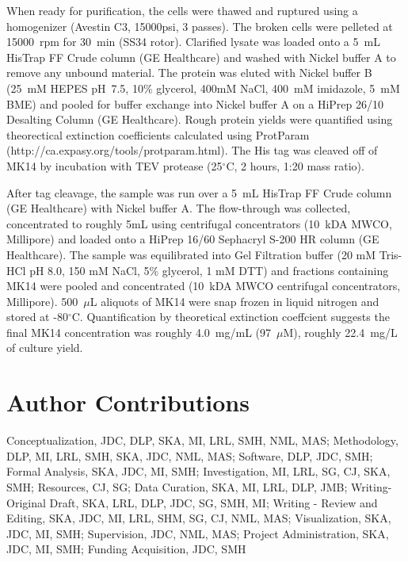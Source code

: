 \documentclass[phd,tocprelim]{cornell}
\begin{document}
When ready for purification, the cells were thawed and ruptured using a homogenizer (Avestin C3, 15000psi, 3 passes). The broken cells were pelleted at 15000~rpm for 30~min (SS34 rotor). Clarified lysate was loaded onto a  5~mL HisTrap FF Crude column (GE Healthcare) and washed with Nickel buffer A to remove any unbound material. The protein was eluted with Nickel buffer B (25~mM HEPES pH~7.5, 10\% glycerol, 400mM NaCl, 400~mM imidazole, 5~mM BME) and pooled for buffer exchange into Nickel buffer A on a HiPrep 26/10 Desalting Column (GE Healthcare). Rough protein yields were quantified using theorectical extinction coefficients calculated using ProtParam (http://ca.expasy.org/tools/protparam.html). The His tag was cleaved off of MK14 by incubation with TEV protease (25$^{\circ}$C, 2 hours, 1:20 mass ratio). 

After tag cleavage, the sample was run over a 5~mL HisTrap FF Crude column (GE Healthcare) with Nickel buffer A. 
The flow-through was collected, concentrated to roughly 5mL using centrifugal concentrators (10~kDA MWCO, Millipore) and loaded onto a HiPrep 16/60 Sephacryl S-200 HR column (GE Healthcare). 
The sample was equilibrated into Gel Filtration buffer (20 mM Tris-HCl pH 8.0, 150 mM NaCl, 5\% glycerol, 1 mM DTT) and fractions containing MK14 were pooled and concentrated (10~kDA MWCO centrifugal concentrators, Millipore). 
500~$\mu$L aliquots of MK14 were snap frozen in liquid nitrogen and stored at -80$^{\circ}$C. Quantification by theoretical extinction coeffcient suggests the final MK14 concentration was roughly 4.0~mg/mL (97~$\mu$M), roughly 22.4~mg/L of culture yield.  


\section{Author Contributions}

Conceptualization, JDC, DLP, SKA, MI, LRL, SMH, NML, MAS; Methodology, DLP, MI, LRL, SMH, SKA, JDC, NML, MAS; Software, DLP, JDC, SMH; Formal Analysis, SKA, JDC, MI, SMH; Investigation, MI, LRL, SG, CJ, SKA, SMH; Resources, CJ, SG;  Data Curation, SKA, MI, LRL, DLP, JMB; Writing-Original Draft, SKA, LRL, DLP, JDC, SG, SMH, MI; Writing - Review and Editing, SKA, JDC, MI, LRL, SHM, SG, CJ, NML, MAS; Visualization, SKA, JDC, MI, SMH; Supervision, JDC, NML, MAS; Project Administration, SKA, JDC, MI, SMH; Funding Acquisition, JDC, SMH
\end{document}
